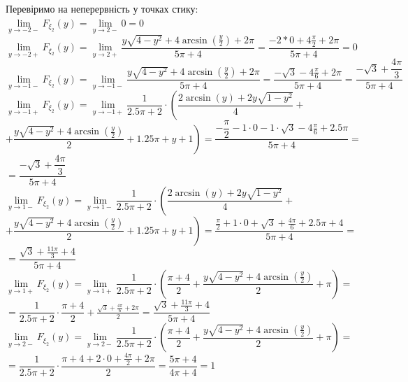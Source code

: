 \documentclass[14pt,a4paper]{scrartcl}
\theoremstyle{definition}
\theoremstyle{remark}
\theoremstyle{definition}
\theoremstyle{definition}
\begin{document}
Перевіримо на неперервність у точках стику:\\
$
 \lim\limits_{y\to  -2-}{ F_{\xi_2}(y)} =  \lim\limits_{y\to  2-}{0} = 0
$\\
$
 \lim\limits_{y\to  -2+}{ F_{\xi_2}(y)} =  \lim\limits_{y\to  2+}{\dfrac{y\sqrt{4-y^2}+4\arcsin\left(\frac{y}{2}\right) + 2\pi}{5\pi + 4}} = \dfrac{
 -2*0+4 \frac{\pi}{2} +2{\pi}
 }{ 5\pi + 4}= 0
$\\
$
 \lim\limits_{y\to  -1-}{ F_{\xi_2}(y)} =  \lim\limits_{y\to  -1-}{\dfrac{y\sqrt{4-y^2}+4\arcsin\left(\frac{y}{2}\right) + 2\pi}{5\pi + 4}} = \dfrac{
 -\sqrt{3}-4 \frac{\pi}{6} +2{\pi}
 }{ 5\pi + 4} = \dfrac{-\sqrt{3} + \dfrac{4\pi}{3} }{5\pi + 4}
$\\
$
 \lim\limits_{y\to  -1+}{ F_{\xi_2}(y)} =  \lim\limits_{y\to  -1+}{\dfrac{1}{2.5\pi +
 2} \cdot \left( \dfrac{2\arcsin\left(y\right)+2y\sqrt{1-y^2}}{4} \right.}+$\\$+ \left. \dfrac{y\sqrt{4-y^2}+4\arcsin\left(\frac{y}{2}\right)}{2}+1.25{\pi} + y + 1 \right)  = \dfrac{- \dfrac{\pi}{2} -1 \cdot 0 - 	1\cdot \sqrt{3} - 4  \frac{\pi}{6} + 2.5\pi}{5\pi + 4}  =$\\$ = \dfrac{-\sqrt{3} + \dfrac{4\pi}{3} }{5\pi + 4}
$\\
$
\lim\limits_{y\to  1-}{ F_{\xi_2}(y)} =  \lim\limits_{y\to  1-}{\dfrac{1}{2.5\pi +
2} \cdot \left( \dfrac{2\arcsin\left(y\right)+2y\sqrt{1-y^2}}{4} \right.}+$\\$+ \left. \dfrac{y\sqrt{4-y^2}+4\arcsin\left(\frac{y}{2}\right)}{2}+1.25{\pi} + y + 1 \right)  = \dfrac{ \frac{\pi}{2} + 1\cdot 0 + \sqrt{3} + \frac{4\pi}{6} + 2.5\pi + 4  }{5\pi + 4} =
$\\
$
= \dfrac{ \sqrt{3} + \frac{11\pi}{3}  + 4  }{5\pi + 4}
$\\
$
\lim\limits_{y\to  1+ }{ F_{\xi_2}(y)} =  \lim\limits_{y\to 1+}{ \dfrac{1}{2.5\pi + 2} \cdot \left( \dfrac{{\pi}+4}{2} + \dfrac{y\sqrt{4-y^2}+4\arcsin\left(\frac{y}{2}\right)}{2}+{\pi} \right) } =
$\\
$
=\dfrac{1}{2.5\pi + 2} \cdot \dfrac{ \pi + 4}{ 2} + \frac{\sqrt{3} + \frac{4\pi}{6}  + 2\pi}{2} = \dfrac{ \sqrt{3} + \frac{11\pi}{3}  + 4  }{5\pi + 4}
$\\
$
\lim\limits_{y\to  2-}{ F_{\xi_2}(y)} =  \lim\limits_{y\to 2-}{ \dfrac{1}{2.5\pi + 2} \cdot \left( \dfrac{{\pi}+4}{2} + \dfrac{y\sqrt{4-y^2}+4\arcsin\left(\frac{y}{2}\right)}{2}+{\pi} \right) } =
$
$
= \dfrac{1}{2.5\pi + 2} \cdot\dfrac{\pi + 4 + 2\cdot 0 + \frac{4\pi}{2} + 2\pi }{2} = \dfrac{5\pi + 4}{4\pi + 4} = 1
$\\
\end{document}
